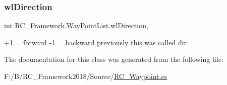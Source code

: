 \subsubsection{\texorpdfstring{wl\+Direction}{wlDirection}}
{\footnotesize\ttfamily int R\+C\+\_\+\+Framework.\+Way\+Point\+List.\+wl\+Direction\hspace{0.3cm}{\ttfamily [get]}, {\ttfamily [set]}}



+1 = forward -\/1 = backward previously this was called dir 



The documentation for this class was generated from the following file\+:\begin{DoxyCompactItemize}
\item 
F\+:/\+B/\+R\+C\+\_\+\+Framework2018/\+Source/\mbox{\hyperlink{_r_c___waypoint_8cs}{R\+C\+\_\+\+Waypoint.\+cs}}\end{DoxyCompactItemize}
